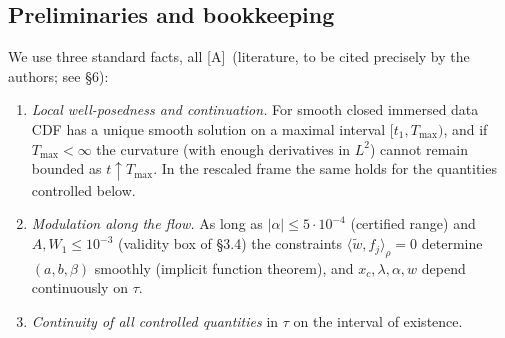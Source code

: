 \documentclass[11pt]{article}
\theoremstyle{definition}
\theoremstyle{remark}
\newcommand{\tA}{\textsc{[A]}}
\newcommand{\ip}[2]{\langle #1,#2\rangle}
\begin{document}
\subsection{Preliminaries and bookkeeping}
We use three standard facts, all \tA\ (literature, to be cited precisely by the authors; see \S6):
\begin{enumerate}[label=(P\arabic*),leftmargin=*]
\item \emph{Local well-posedness and continuation.} For smooth closed immersed data CDF has a unique smooth solution on a maximal interval $[t_1,T_{\max})$, and if $T_{\max}<\infty$ the curvature (with enough derivatives in $L^2$) cannot remain bounded as $t\uparrow T_{\max}$. In the rescaled frame the same holds for the quantities controlled below.
\item \emph{Modulation along the flow.} As long as $|\alpha|\le5\cdot10^{-4}$ (certified range) and $A,W_1\le10^{-3}$ (validity box of \S3.4) the constraints $\ip{\tilde w}{f_j}_\rho=0$ determine $(a,b,\beta)$ smoothly (implicit function theorem), and $x_c,\lambda,\alpha,w$ depend continuously on $\tau$.
\item \emph{Continuity of all controlled quantities} in $\tau$ on the interval of existence.
\end{enumerate}
\end{document}
